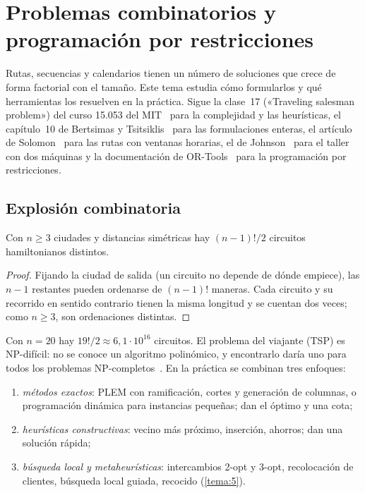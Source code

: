 \chapter{Problemas combinatorios y programación por restricciones}
\label{tema:3}

Rutas, secuencias y calendarios tienen un número de soluciones que crece de forma factorial con el tamaño. Este tema estudia cómo formularlos y qué herramientas los resuelven en la práctica. Sigue la clase~17 («Traveling salesman problem») del curso 15.053 del MIT~\cite{mit15053} para la complejidad y las heurísticas, el capítulo~10 de Bertsimas y Tsitsiklis~\cite{bt} para las formulaciones enteras, el artículo de Solomon~\cite{solomon} para las rutas con ventanas horarias, el de Johnson~\cite{johnson} para el taller con dos máquinas y la documentación de OR-Tools~\cite{ortools-vrptw,ortools-js,ortools-cpsat} para la programación por restricciones.

\section{Explosión combinatoria}

\begin{proposicion}\label{prop:circuitos}
Con $n\ge 3$ ciudades y distancias simétricas hay $(n-1)!/2$ circuitos hamiltonianos distintos.
\end{proposicion}

\begin{proof}
Fijando la ciudad de salida (un circuito no depende de dónde empiece), las $n-1$ restantes pueden ordenarse de $(n-1)!$ maneras. Cada circuito y su recorrido en sentido contrario tienen la misma longitud y se cuentan dos veces; como $n\ge 3$, son ordenaciones distintas.
\end{proof}

Con $n=20$ hay $19!/2\approx 6{,}1\cdot 10^{16}$ circuitos. El problema del viajante (TSP) es NP-difícil: no se conoce un algoritmo polinómico, y encontrarlo daría uno para todos los problemas NP-completos~\cite{mit15053}. En la práctica se combinan tres enfoques:
\begin{enumerate}[label=(\alph*)]
  \item \emph{métodos exactos}: PLEM con ramificación, cortes y generación de columnas, o programación dinámica para instancias pequeñas; dan el óptimo y una cota;
  \item \emph{heurísticas constructivas}: vecino más próximo, inserción, ahorros; dan una solución rápida;
  \item \emph{búsqueda local y metaheurísticas}: intercambios 2-opt y 3-opt, recolocación de clientes, búsqueda local guiada, recocido (\cref{tema:5}).
\end{enumerate}

